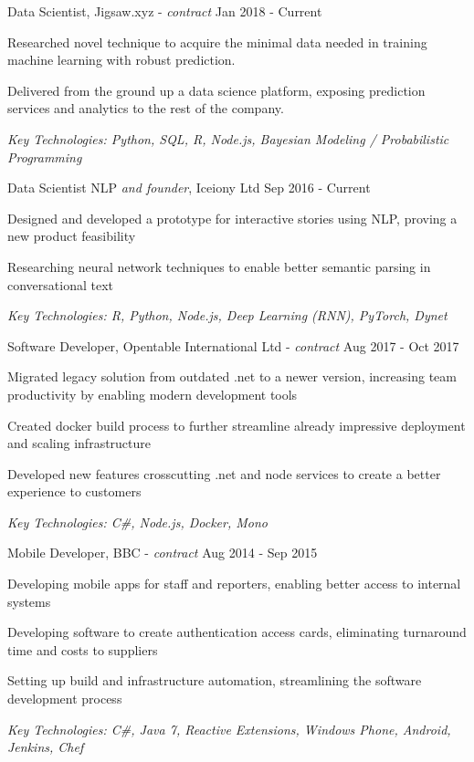 \documentclass[11pt,article,oneside]{memoir}
\newenvironment{itemize*}{%
  \renewcommand\labelitemi{\textbullet}
  \footnotesize
  \begin{itemize}%
    \setlength{\itemsep}{0pt}}%
  {\end{itemize}
}
\begin{document}
\bigskip 


\normalsize
\medskip
\ind Data Scientist, Jigsaw.xyz - \emph{contract} \hfill Jan 2018 - Current
\begin{itemize*}
  \item Researched novel technique to acquire the minimal data needed in training machine learning with robust prediction.  
  \item Delivered from the ground up a data science platform, exposing prediction services and analytics to the rest of the company.
\end{itemize*}
\ind \hspace{0.35in} \footnotesize \emph{Key Technologies: Python, SQL, R, Node.js, Bayesian Modeling / Probabilistic Programming}

\normalsize
\medskip
\ind Data Scientist NLP \emph{and founder}, Iceiony Ltd \hfill Sep 2016 - Current
\begin{itemize*}
  \item Designed and developed a prototype for interactive stories using NLP, proving a new product feasibility 
  \item Researching neural network techniques to enable better semantic parsing in conversational text 
\end{itemize*}
\ind \hspace{0.35in} \footnotesize \emph{Key Technologies: R, Python, Node.js, Deep Learning (RNN), PyTorch, Dynet}

\normalsize
\medskip
\ind Software Developer, Opentable International Ltd - \emph{contract} \hfill Aug 2017 - Oct 2017
\begin{itemize*}
  \item Migrated legacy solution from outdated .net to a newer version, increasing team productivity by enabling modern development tools 
  \item Created docker build process to further streamline already impressive deployment and scaling infrastructure 
  \item Developed new features crosscutting .net and node services to create a better experience to customers
\end{itemize*}
\ind \hspace{0.35in} \footnotesize \emph{Key Technologies: C\#, Node.js, Docker, Mono}

\normalsize
\medskip
\ind Mobile Developer, BBC - \emph{contract} \hfill Aug 2014 - Sep 2015
\begin{itemize*}
  \item Developing mobile apps for staff and reporters, enabling better access to internal systems
  \item Developing software to create authentication access cards, eliminating turnaround time and costs to suppliers
  \item Setting up build and infrastructure automation, streamlining the software development process
\end{itemize*}
\ind \hspace{0.35in} \footnotesize \emph{Key Technologies: C\#, Java 7, Reactive Extensions, Windows Phone, Android, Jenkins, Chef}
\end{document}
